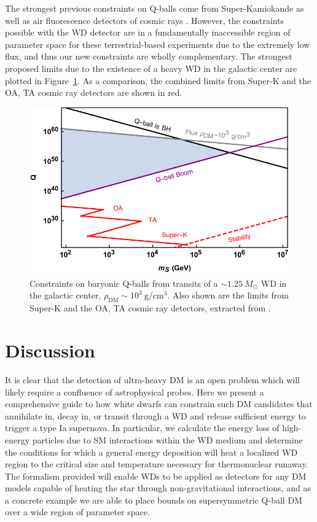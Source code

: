 \documentclass[twocolumn, preprintnumbers,amsmath,amssymb,prd, superscriptaddress]{revtex4}
\begin{document}
The strongest previous constraints on Q-balls come from Super-Kamiokande as well as air fluorescence detectors of cosmic rays \cite{Dine:2003ax}.
However, the constraints possible with the WD detector are in a fundamentally inaccessible region of parameter space for these terrestrial-based experiments due to the extremely low flux, and thus our new constraints are wholly complementary.
The strongest proposed limits due to the existence of a heavy WD in the galactic center are plotted in Figure~\ref{fig:Qballconstraint}. As a comparison, the combined limits from Super-K and the OA, TA cosmic ray detectors are shown in red.
\begin{figure}
\includegraphics[scale=.55]{Qballconstraint.pdf}
\caption{Constraints on baryonic Q-balls from transits of a $\sim 1.25 ~M_{\odot}$ WD in the galactic center, $\rho_\text{DM} \sim 10^3 ~\text{g}/\text{cm}^3$. Also shown are the limits from Super-K and the OA, TA cosmic ray detectors, extracted from \cite{Dine:2003ax}.}
\label{fig:Qballconstraint}
\end{figure}

\section{Discussion}
\label{sec:Discussion}

It is clear that the detection of ultra-heavy DM is an open problem which will likely require a confluence of astrophysical probes.
Here we present a comprehensive guide to how white dwarfs can constrain such DM candidates that annihilate in, decay in, or transit through a WD and release sufficient energy to trigger a type Ia supernova.
In particular, we calculate the energy loss of high-energy particles due to SM interactions within the WD medium and determine the conditions for which a general energy deposition will heat a localized WD region to the critical size and temperature necessary for thermonuclear runaway.
The formalism provided will enable WDs to be applied as detectors for any DM models capable of heating the star through non-gravitational interactions, and as a concrete example we are able to place bounds on supersymmetric Q-ball DM over a wide region of parameter space.
\end{document}
